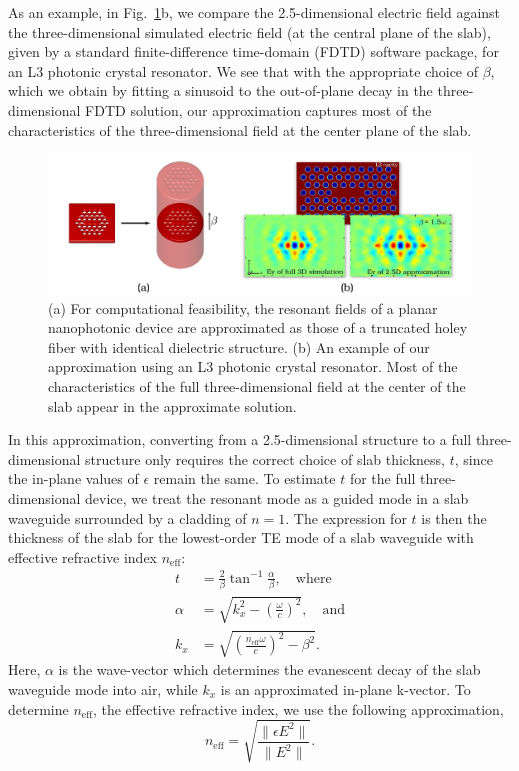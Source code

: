 As an example, in Fig.~\ref{approx}b, we compare the 2.5-dimensional electric field against the three-dimensional simulated electric field (at the central plane of the slab), given by a standard finite-difference time-domain (FDTD) software package, for an L3 photonic crystal resonator. We see that with the appropriate choice of $\beta$, which we obtain by fitting a sinusoid to the out-of-plane decay in the three-dimensional FDTD solution, our approximation captures most of the characteristics of the three-dimensional field at the center plane of the slab. 
\begin{figure}[hbt]
\centering\includegraphics[width=\textwidth]{p2/approx}
\caption{(a) For computational feasibility, the resonant fields of a planar nanophotonic device are approximated as those of a truncated holey fiber with identical dielectric structure. (b) An example of our approximation using an L3 photonic crystal resonator. Most of the characteristics of the full three-dimensional field at the center of the slab appear in the approximate solution.}\label{approx}
\end{figure}

In this approximation, converting from a 2.5-dimensional structure to a full three-dimensional structure only requires the correct choice of slab thickness, $t$, since the in-plane values of $\epsilon$ remain the same. To estimate $t$ for the full three-dimensional device, we treat the resonant mode as a guided mode in a slab waveguide surrounded by a cladding of $n=1$. The expression for $t$ is then the thickness of the slab for the lowest-order TE mode of a slab waveguide with effective refractive index $n_\text{eff}$\cite{Inan00}:
\begin{align}
t &= \frac{2}{\beta}\tan^{-1}\frac{\alpha}{\beta},\label{t} \quad\text{where} \\
\alpha &= \sqrt{k_x^2 - \left(\frac{\omega}{c}\right)^2}, \quad\text{and} \\
k_x &= \sqrt{\left(\frac{n_\text{eff}\omega}{c}\right)^2 - \beta^2}.
\end{align}
Here, $\alpha$ is the wave-vector which determines the evanescent decay of the slab waveguide mode into air, while $k_x$ is an approximated in-plane k-vector. To determine $n_\text{eff}$, the effective refractive index, we use the following approximation,
\begin{equation}
n_\text{eff} = \sqrt{\frac{\|\epsilon E^2\|}{\|E^2\|}}.
\end{equation}

